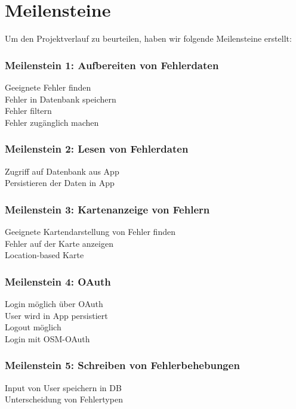 \section{Meilensteine}
\label{meilensteine}

Um den Projektverlauf zu beurteilen, haben wir folgende Meilensteine erstellt:

\subsubsection{Meilenstein 1: Aufbereiten von Fehlerdaten}
\tick Geeignete Fehler finden \\
\tick Fehler in Datenbank speichern \\
\tick Fehler filtern \\
\tick Fehler zugänglich machen

\subsubsection{Meilenstein 2: Lesen von Fehlerdaten}

\tick Zugriff auf Datenbank aus App \\
\tick Persistieren der Daten in App

\subsubsection{Meilenstein 3: Kartenanzeige von Fehlern}

\tick Geeignete Kartendarstellung von Fehler finden \\
\tick Fehler auf der Karte anzeigen \\
\tick Location-based Karte

\subsubsection{Meilenstein 4: OAuth}

\tick Login möglich über OAuth \\
\tick User wird in App persistiert \\
\tick Logout möglich \\
\cross Login mit OSM-OAuth

\subsubsection{Meilenstein 5: Schreiben von Fehlerbehebungen}

\tick Input von User speichern in DB \\
\tick Unterscheidung von Fehlertypen

